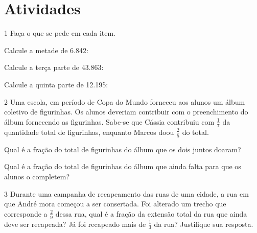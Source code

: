 \section*{Atividades}

\num{1} Faça o que se pede em cada item.

\begin{escolha}
\item
Calcule a metade de 6.842: 

\item
Calcule a terça parte de 43.863: 

\item
Calcule a quinta parte de 12.195: 


\end{escolha}

\num{2} Uma escola, em período de Copa do Mundo forneceu aos alunos um
álbum coletivo de figurinhas. Os alunos deveriam contribuir com o
preenchimento do álbum fornecendo as figurinhas. Sabe-se que Cássia
contribuiu com $\frac{1}{7}$ da quantidade total de figurinhas, enquanto Marcos
doou $\frac{2}{5}$ do total.

\begin{escolha}
\item
  Qual é a fração do total de figurinhas do álbum que os dois juntos doaram?
\bigskip

\item
  Qual é a fração do total de figurinhas do álbum que ainda falta para que os alunos o completem?
\bigskip
\end{escolha}


\num{3} Durante uma campanha de recapeamento das ruas de uma cidade, a rua em
que André mora começou a ser consertada. Foi alterado um trecho que corresponde a $\frac{2}{9}$ dessa rua, qual é a fração da extensão total da rua que ainda deve ser
recapeada? Já foi recapeado mais de $\frac{1}{3}$ da rua? Justifique sua resposta.


